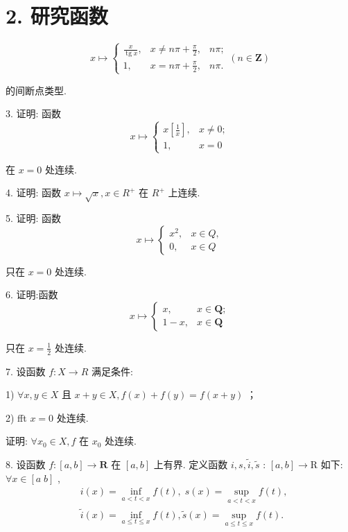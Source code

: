 \section*{2. 研究函数}
$$x \mapsto  \left\{  {\begin{array}{lll} \frac{x}{\operatorname{tg}x}, & x \neq  {n\pi } + \frac{\pi }{2}, & {n\pi }; \\  1, & x = {n\pi } + \frac{\pi }{2}, & {n\pi }. \end{array}\left( {n \in  \mathbf{Z}}\right) }\right.$$

的间断点类型.

3. 证明: 函数
$$x \mapsto  \left\{  \begin{array}{ll} x\left\lbrack  \frac{1}{x}\right\rbrack  , & x \neq  0; \\  1, & x = 0 \end{array}\right.$$

在 $x = 0$ 处连续.

4. 证明: 函数 $x \mapsto  \sqrt{x},x \in  {R}^{ + }$ 在 ${R}^{ + }$ 上连续.

5. 证明: 函数
$$x \mapsto  \left\{  \begin{array}{ll} {x}^{2}, & x \in  Q, \\  0, & x \in  Q \end{array}\right.$$

只在 $x = 0$ 处连续.

6. 证明:函数
$$x \mapsto  \left\{  \begin{array}{ll} x, & x \in  \mathbf{Q}; \\  1 - x, & x \in  \mathbf{Q} \end{array}\right.$$

只在 $x = \frac{1}{2}$ 处连续.

7. 设函数 $f : X \rightarrow  R$ 满足条件:

1) $\forall x,y \in  X$ 且 $x + y \in  X,f\left( x\right)  + f\left( y\right)  = f\left( {x + y}\right)$ ；

2) fft $x = 0$ 处连续.

证明: $\forall {x}_{0} \in  X,f$ 在 ${x}_{0}$ 处连续.

8. 设函数 $f : \left\lbrack  {a,b}\right\rbrack   \rightarrow  \mathbf{R}$ 在 $\left\lbrack  {a,b}\right\rbrack$ 上有界. 定义函数 $i,s,\widetilde{i},\widetilde{s}$ : $\left\lbrack  {a,b}\right\rbrack   \rightarrow  \mathrm{R}$ 如下: $\forall x \in  \left\lbrack  {a\;b}\right\rbrack$ ,
\begin{align*}
	&i\left( x\right)  = \mathop{\inf }\limits_{{a < t < x}}f\left( t\right) ,\;s\left( x\right)  = \mathop{\sup }\limits_{{a < t < x}}f\left( t\right) ,\\
	&\widetilde{i}\left( x\right)  = \mathop{\inf }\limits_{{a \leq  t \leq  x}}f\left( t\right) ,\widetilde{s}\left( x\right)  = \mathop{\sup }\limits_{{a \leq  t \leq  x}}f\left( t\right) .
\end{align*}

